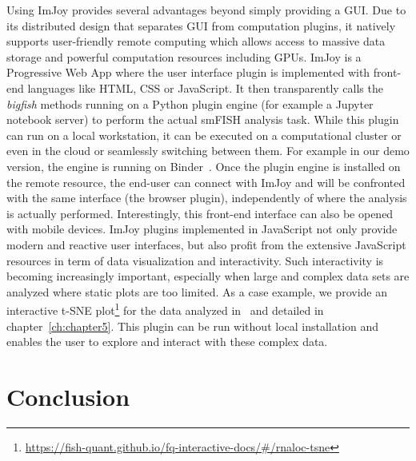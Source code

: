 Using ImJoy provides several advantages beyond simply providing a \ac{GUI}.
Due to its distributed design that separates \ac{GUI} from computation plugins, it natively supports user-friendly remote computing which allows access to massive data storage and powerful computation resources including GPUs.
ImJoy is a Progressive Web App where the user interface plugin is implemented with front-end languages like HTML, CSS or JavaScript.
It then transparently calls the \emph{bigfish} methods running on a Python plugin engine (for example a Jupyter notebook server) to perform the actual \ac{smFISH} analysis task.
While this plugin can run on a local workstation, it can be executed on a computational cluster or even in the cloud or seamlessly switching between them.
For example in our demo version, the engine is running on Binder~\cite{Jupyter2018Binder2}.
Once the plugin engine is installed on the remote resource, the end-user can connect with ImJoy and will be confronted with the same interface (the browser plugin), independently of where the analysis is actually performed.
Interestingly, this front-end interface can also be opened with mobile devices.
ImJoy plugins implemented in JavaScript not only provide modern and reactive user interfaces, but also profit from the extensive JavaScript resources in term of data visualization and interactivity.
Such interactivity is becoming increasingly important, especially when large and complex data sets are analyzed where static plots are too limited.
As a case example, we provide an interactive t-SNE plot\footnote{\url{https://fish-quant.github.io/fq-interactive-docs/\#/rnaloc-tsne}} for the data analyzed in~\cite{CHOUAIB_2020} and detailed in chapter~\ref{ch:chapter5}.
This plugin can be run without local installation and enables the user to explore and interact with these complex data.

\section{Conclusion}
\label{sec:conclusion}

